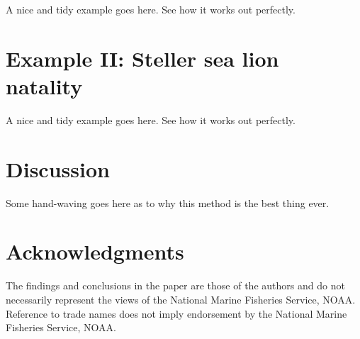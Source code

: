 \documentclass[fleqn]{article}
\begin{document}
A nice and tidy example goes here. See how it works out perfectly.

\section{Example II: Steller sea lion natality}

A nice and tidy example goes here. See how it works out perfectly.

\section{Discussion}

Some hand-waving goes here as to why this method is the best thing ever.


\section*{Acknowledgments}
The findings and conclusions in the paper are those of the authors and do not necessarily represent the views of the National Marine Fisheries Service, NOAA. Reference to trade names does not imply endorsement by the National Marine Fisheries Service, NOAA.

\renewcommand{\baselinestretch}{1}\normalsize



\clearpage


\renewcommand{\arraystretch}{1.33}
\end{document}
